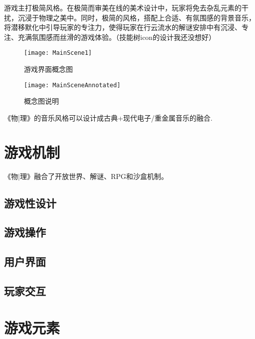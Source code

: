 \documentclass{tstextbook}
\begin{document}
游戏主打极简风格。在极简而审美在线的美术设计中，玩家将免去杂乱元素的干扰，沉浸于物理之美中。同时，极简的风格，搭配上合适、有氛围感的背景音乐，将潜移默化中引导玩家的专注力，使得玩家在行云流水的解谜安排中有沉浸、专注、充满氛围感而丝滑的游戏体验。（技能树icon的设计我还没想好）

\begin{figure}[H]
\centering
\texttt{[image: MainScene1]} 
\caption{游戏界面概念图}
\label{MainScene}
\end{figure}

\begin{figure}[H]
\centering
\texttt{[image: MainSceneAnnotated]} 
\caption{概念图说明}
\label{MainScene}
\end{figure}

《物|理》的音乐风格可以设计成古典+现代电子/重金属音乐的融合.

\chapter{游戏机制}

\begin{summary}
《物$|$理》融合了开放世界、解谜、RPG和沙盒机制。
\end{summary}

\section{游戏性设计}


\section{游戏操作}


\section{用户界面}



\section{玩家交互}


\chapter{游戏元素}
\end{document}
